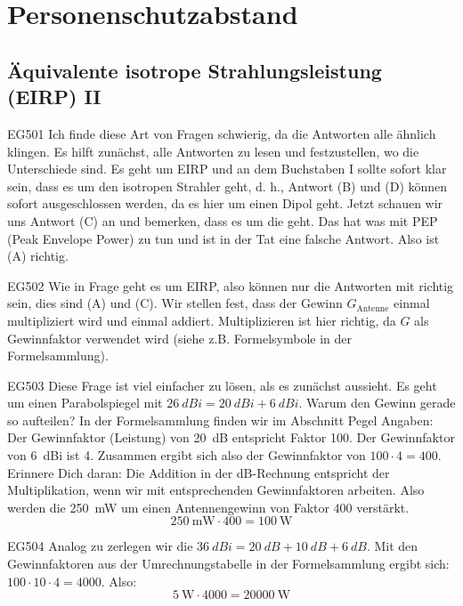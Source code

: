 \setcounter{section}{14}
\section{Personenschutzabstand}
\subsection{Äquivalente isotrope Strahlungsleistung (EIRP) II}

\begin{sol}{EG501}
Ich finde diese Art von Fragen schwierig, da die Antworten alle ähnlich klingen. 
Es hilft zunächst, alle Antworten zu lesen und festzustellen, wo die Unterschiede sind.
Es geht um EIRP und an dem Buchstaben I sollte sofort klar sein, dass es um den isotropen Strahler geht, d. h., Antwort (B) und (D) können sofort ausgeschlossen werden, da es hier um einen Dipol geht. Jetzt schauen wir uns Antwort (C) an und bemerken, dass es um die  geht. Das hat was mit PEP (Peak Envelope Power) zu tun und ist in der Tat eine falsche Antwort. Also ist (A) richtig.
\end{sol}

\begin{sol}{EG502}
Wie in Frage  geht es um EIRP, also können nur die Antworten mit  richtig sein, dies sind (A) und (C). Wir stellen fest, dass der Gewinn $G_\text{Antenne}$ einmal multipliziert wird und einmal addiert. Multiplizieren ist hier richtig, da $G$ als Gewinnfaktor verwendet wird (siehe z.B. Formelsymbole in der Formelsammlung).
\end{sol}


\begin{sol}{EG503}
Diese Frage ist viel einfacher zu lösen, als es zunächst aussieht.
Es geht um einen Parabolspiegel mit $\SI{26}{dBi} = \SI{20}{dBi} + \SI{6}{dBi}$.
Warum den Gewinn gerade so aufteilen? In der Formelsammlung finden wir im Abschnitt Pegel Angaben: Der Gewinnfaktor (Leistung) von \SI{20}{dB} entspricht Faktor 100. Der Gewinnfaktor von \SI{6}{dBi} ist 4. Zusammen ergibt sich also der Gewinnfaktor von $100 \cdot 4 = 400$. Erinnere Dich daran: Die Addition in der dB-Rechnung entspricht der Multiplikation, wenn wir mit entsprechenden Gewinnfaktoren arbeiten. 
Also werden die \SI{250}{\milli\watt} um einen Antennengewinn von Faktor 400 verstärkt.
$$ \SI{250}{\milli\watt} \cdot 400 = \SI{100}{\watt} $$
\end{sol}


\begin{sol}{EG504}
    Analog zu  zerlegen wir die $\SI{36}{dBi} =  \SI{20}{dB} + \SI{10}{dB} + \SI{6}{dB}$.
    Mit den Gewinnfaktoren aus der Umrechnungstabelle in der Formelsammlung ergibt sich: $100 \cdot 10 \cdot 4 = 4000$.
    Also:
    $$ \SI{5}{\watt} \cdot 4000 = \SI{20000}{\watt} $$
\end{sol}


